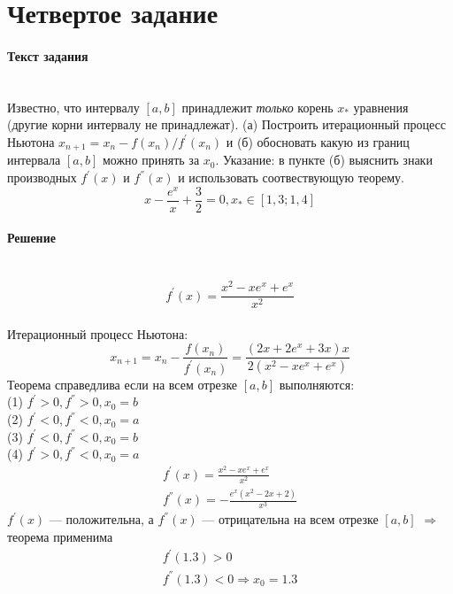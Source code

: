 \section{Четвертое задание}

\paragraph{Текст задания} ~\\
Известно, что интервалу $\left[a, b\right]$ принадлежит \textit{\textsl{только}} корень $x_{*}$ уравнения (другие корни интервалу не принадлежат). (а) Построить итерационный процесс Ньютона $x_{n+1} = x_{n} -f(x_{n})/f^{'}(x_{n})$ и (б) обосновать какую из границ интервала $\left[a, b\right]$ можно принять за $x_{0}$. Указание: в пункте (б) выяснить знаки производных $f^{'}(x)$ и $f^{''}(x)$ и использовать соотвествующую теорему.\\[3mm]
\[
  x - \frac{e^{x}}{x} + \frac{3}{2} = 0, x_{*} \in \left[1, 3; 1, 4\right]
\]

\paragraph{Решение} ~\\
\[
  f^{'}(x) = \frac{x^{2}-xe^{x}+e^{x}}{x^{2}}
\]\\[1mm]
Итерационный процесс Ньютона:
\[
  x_{n+1} = x_{n} - \frac{f(x_{n})}{f^{'}(x_{n})} = \frac{(2x+2e^{x}+3x)x}{2(x^{2}-xe^{x}+e^{x})}
\]
Теорема справедлива если на всем отрезке $\left[a, b\right]$ выполняются:\\
(1) $f^{'} > 0, f^{''} > 0, x_{0} = b$\\
(2) $f^{'} < 0, f^{''} < 0, x_{0} = a$\\
(3) $f^{'} < 0, f^{''} < 0, x_{0} = b$\\
(4) $f^{'} > 0, f^{''} < 0, x_{0} = a$\\
\begin{gather*}
  f^{'}(x) = \frac{x^{2}-xe^{x}+e^{x}}{x^{2}} \\
  f^{''}(x) = -\frac{e^{x}(x^{2}-2x+2)}{x^{3}}
\end{gather*}
$f^{'}(x)$ --- положительна, а $ f^{''}(x)$ --- отрицательна на всем отрезке $\left[a, b\right]$ $\Rightarrow$ теорема применима
\begin{gather*}
  f^{'}(1.3) > 0 \\
  f^{''}(1.3) < 0 \Rightarrow x_{0} = 1.3
\end{gather*}

